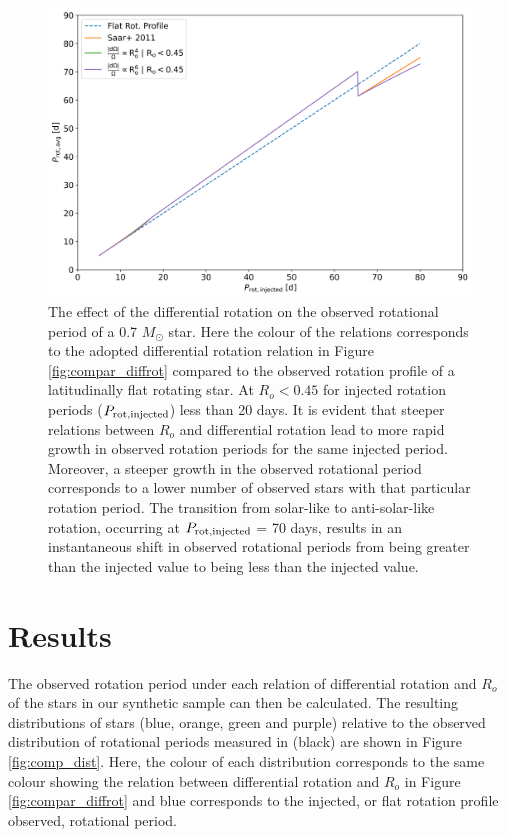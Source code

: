 \begin{figure}
\centering
  \includegraphics[width=\textwidth]{Figures/rot_gap_figures/comparison_observed_rot_periods.png}
  \caption[The effect of the differential rotation on the observed rotational period of a 0.7 $M_{\odot}$ star against $R_o$.]{
  	The effect of the differential rotation on the observed rotational period of a 0.7 $M_{\odot}$ star. Here the colour of the relations corresponds to the adopted differential rotation relation in Figure \ref{fig:compar_diffrot} compared to the observed rotation profile of a latitudinally flat rotating star. At $R_o<0.45$ for injected rotation periods ($P_{\rm{rot, injected}}$) less than 20 days. It is evident that steeper relations between $R_o$ and differential rotation lead to more rapid growth in observed rotation periods for the same injected period. Moreover, a steeper growth in the observed rotational period corresponds to a lower number of observed stars with that particular rotation period. The transition from solar-like to anti-solar-like rotation, occurring at $P_{\rm{rot, injected}}$ = 70 days, results in an instantaneous shift in observed rotational periods from being greater than the injected value to being less than the injected value.
}
  \label{fig:comp_per}
\end{figure}

\section{Results}
\label{sec:results}
The observed rotation period under each relation of differential rotation and $R_o$ of the stars in our synthetic sample can then be calculated.
The resulting distributions of stars (blue, orange, green and purple) relative to the observed distribution of \kepler{} rotational periods measured in \citet{mcquillan_rotation_2014} (black) are shown in Figure \ref{fig:comp_dist}.
Here, the colour of each distribution corresponds to the same colour showing the relation between differential rotation and $R_o$ in Figure \ref{fig:compar_diffrot} and blue corresponds to the injected, or flat rotation profile observed, rotational period.


